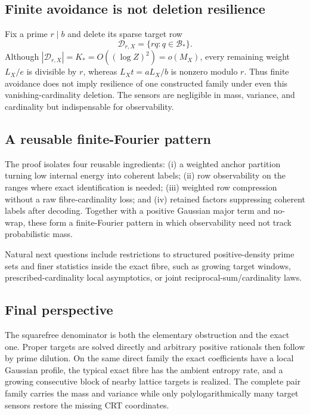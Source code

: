 \subsection{Finite avoidance is not deletion resilience}

Fix a prime $r\mid b$ and delete its sparse target row
\[
\mathcal D_{r,X}=\{rq:q\in\mathcal B_*\}.
\tag{10.1}\label{eq:10.1}
\]
Although $|\mathcal D_{r,X}|=K_*=O((\log Z)^2)=o(M_X)$, every remaining weight $L_X/e$ is divisible by $r$, whereas $L_Xt=aL_X/b$ is nonzero modulo $r$. Thus finite avoidance does not imply resilience of one constructed family under even this vanishing-cardinality deletion. The sensors are negligible in mass, variance, and cardinality but indispensable for observability.

\subsection{A reusable finite-Fourier pattern}

The proof isolates four reusable ingredients: (i) a weighted anchor partition turning low internal energy into coherent labels; (ii) row observability on the ranges where exact identification is needed; (iii) weighted row compression without a raw fibre-cardinality loss; and (iv) retained factors suppressing coherent labels after decoding. Together with a positive Gaussian major term and no-wrap, these form a finite-Fourier pattern in which observability need not track probabilistic mass.

Natural next questions include restrictions to structured positive-density prime sets and finer statistics inside the exact fibre, such as growing target windows, prescribed-cardinality local asymptotics, or joint reciprocal-sum/cardinality laws.

\subsection{Final perspective}

The squarefree denominator is both the elementary obstruction and the exact one. Proper targets are solved directly and arbitrary positive rationals then follow by prime dilution. On the same direct family the exact coefficients have a local Gaussian profile, the typical exact fibre has the ambient entropy rate, and a growing consecutive block of nearby lattice targets is realized. The complete pair family carries the mass and variance while only polylogarithmically many target sensors restore the missing CRT coordinates.